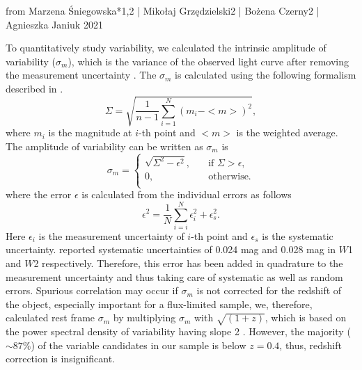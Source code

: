from Marzena Śniegowska*1,2 | Mikołaj Grzędzielski2 | Bożena Czerny2 | Agnieszka Janiuk 2021




















To quantitatively study variability, we calculated the intrinsic 
amplitude of variability ($\sigma_m$), which is the variance of the observed light curve after removing the measurement uncertainty \citep[see also][]{2017ApJ...842...96R}. The $\sigma_m$ is calculated using the following formalism described in \citet{2007AJ....134.2236S}.
\begin{equation}
\Sigma=\sqrt{\frac{1}{n-1}\sum_{i=1}^{N}(m_i - <m>)^2},
\end{equation}
where $m_i$ is the magnitude at $i$-th point and $<m>$ is the weighted average.
The amplitude of variability  can be written as  
$\sigma_m$ is             
\[\sigma_m  =
  \begin{cases}
    \sqrt{\Sigma^2 - \epsilon^2},  & \quad \text{if } \Sigma>\epsilon,\\
     0,                            & \quad  \text{otherwise.}\\
  \end{cases}
\]	               
where the error $\epsilon$ is calculated from the individual errors as follows
\begin{equation}
\epsilon^2=\frac{1}{N}\sum_{i=i}^{N}{\epsilon_{i}^{2} + \epsilon_{s}^2}. 
\end{equation}
Here $\epsilon_{i}$ is the measurement uncertainty of $i$-th point and $\epsilon_{s}$ is the systematic uncertainty. \citet{2011ApJ...735..112J} reported systematic uncertainties of 0.024 mag and 0.028 mag in $W$1 and $W$2 respectively. Therefore, this error has been added in quadrature to the measurement uncertainty and thus taking care of systematic as well as random errors. Spurious correlation may occur if $\sigma_m$ is not corrected for the redshift of the object, especially important for a flux-limited sample, we, therefore, calculated rest frame $\sigma_m$ by multiplying $\sigma_m$ with $\sqrt{(1+z)}$, which is based on the power spectral
density of variability having slope 2 \citep[see][]{2009ApJ...698..895K}. However, the majority ($\sim 87\%$) of the variable candidates in our sample is below $z=0.4$, thus, redshift correction is insignificant.















